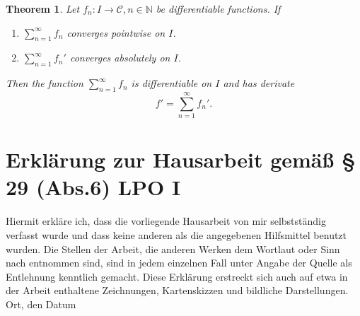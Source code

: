 \documentclass[12pt,a4paper]{scrartcl}
\newtheorem{theorem}{Theorem}[section]
\numberwithin{equation}{section}
\newcommand{\N}{\mathbb{N}} %
\begin{document}
\begin{theorem} \label{th:sumdifferentiation}
Let $f_n:I \rightarrow \mathcal{C} , n \in \N$ be differentiable functions. If
\begin{enumerate}
\item $\sum_{n=1}^{\infty} f_n $ converges pointwise on $I$.
\item $\sum_{n=1}^{\infty} f_n' $ converges absolutely on $I$.
\end{enumerate}
Then the function $\sum_{n=1}^{\infty} f_n$ is differentiable on $I$ and has derivate
$$ f' = \sum_{n=1}^{\infty} f_n'. $$
\end{theorem}




  \newpage

{}
    


      

\newpage
  
 \thispagestyle{empty}


\vspace*{8cm}


\section*{Erklärung zur Hausarbeit gemäß § 29 (Abs.6) LPO I}

Hiermit erkläre ich, dass die vorliegende Hausarbeit von mir selbstständig verfasst wurde und dass keine anderen als die angegebenen Hilfsmittel benutzt wurden. Die Stellen der Arbeit, die anderen Werken dem Wortlaut oder Sinn nach entnommen sind, sind in jedem einzelnen Fall unter Angabe der Quelle als Entlehnung kenntlich gemacht. Diese Erklärung erstreckt sich auch auf etwa in der Arbeit enthaltene Zeichnungen, Kartenskizzen und bildliche Darstellungen. \\[2ex] 

\noindent
Ort, den Datum\\[5ex]

\end{document}

